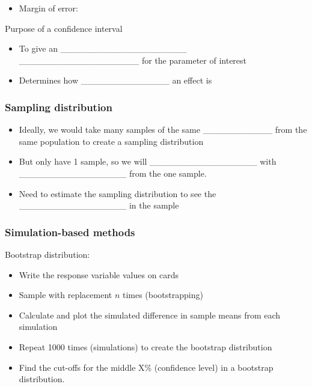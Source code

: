\documentclass[
]{report}
\providecommand{\tightlist}{%
  \setlength{\itemsep}{0pt}\setlength{\parskip}{0pt}}
\begin{document}
\vspace{0.3in}

\begin{itemize}
\tightlist
\item
  Margin of error:
\end{itemize}

\vspace{0.3in}


Purpose of a confidence interval

\begin{itemize}
\item
  To give an \_\_\_\_\_\_\_\_\_\_\_\_\_\_\_\_\_\_\_\_ \_\_\_\_\_\_\_\_\_\_\_\_\_\_\_\_\_\_\_ for the parameter of interest
\item
  Determines how \_\_\_\_\_\_\_\_\_\_\_\_\_\_ an effect is
\end{itemize}


\subsubsection*{Sampling distribution}\label{sampling-distribution}


\begin{itemize}
\item
  Ideally, we would take many samples of the same \_\_\_\_\_\_\_\_\_\_\_ from the same population to create a sampling distribution
\item
  But only have 1 sample, so we will \_\_\_\_\_\_\_\_\_\_\_\_\_\_\_\_\_ with \_\_\_\_\_\_\_\_\_\_\_\_\_\_\_\_\_ from the one sample.
\item
  Need to estimate the sampling distribution to see the \_\_\_\_\_\_\_\_\_\_\_\_\_\_\_\_\_ in the sample
\end{itemize}


\subsubsection*{Simulation-based methods}\label{simulation-based-methods}

Bootstrap distribution:

\begin{itemize}
\item
  Write the response variable values on cards
\item
  Sample with replacement \(n\) times (bootstrapping)
\item
  Calculate and plot the simulated difference in sample means from each simulation
\item
  Repeat 1000 times (simulations) to create the bootstrap distribution
\item
  Find the cut-offs for the middle X\% (confidence level) in a bootstrap distribution.
\end{itemize}
\end{document}
